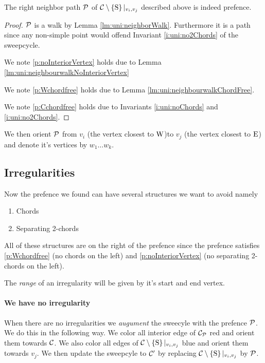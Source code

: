     \begin{lemma}
      \label{lm:uni:isPrefence}
      The right neighbor path $\P$ of $\cpath|_{v_i, v_j}$ described above is indeed prefence.
    \end{lemma}
    \begin{proof}
      $\P$ is a walk by Lemma \ref{lm:uni:neighborWalk}. Furthermore it is a path since any non-simple point would offend Invariant \ref{i:uni:no2Chords} of the sweepcycle.


      We note \ref{p:noInteriorVertex} holds due to Lemma \ref{lm:uni:neighbourwalkNoInteriorVertex}

      We note \ref{p:Wchordfree} holds due to Lemma \ref{lm:uni:neighbourwalkChordFree}.

      We note \ref{p:Cchordfree} holds due to Invariants \ref{i:uni:noChords} and \ref{i:uni:no2Chords}.
    \end{proof}

    We then orient $\P$ from $v_i$ (the vertex closest to $\pW$)to $v_j$ (the vertex closest to $\pE$) and denote it's vertices by $w_1 \ldots w_k$.

  \subsection{Irregularities}
    Now the prefence we found can have several structures we want to avoid
    namely
    \begin{enumerate}
      \itemsep=-4pt
      \item Chords
      \item Separating 2-chords
    \end{enumerate}

    All of these structures are on the right of the prefence since the prefence satisfies \ref{p:Wchordfree} (no chords on the left) and \ref{p:noInteriorVertex} (no separating 2-chords on the left).

    The \emph{range} of an irregularity will be given by it's start and end vertex.

    \paragraph{We have no irregularity}
      When there are no irregularities we \emph{augument} the sweecyle with the prefence $\P$.
      We do this in the following way. We color all interior edge of $\C_\P$ red and orient them towards $\C$. We also color all edges of $\cpath|_{v_i,v_j}$  blue and orient them towards $v_j$. We then update the sweepcyle to $\C'$ by replacing $\cpath|_{v_i,v_j}$ by $\P$.

